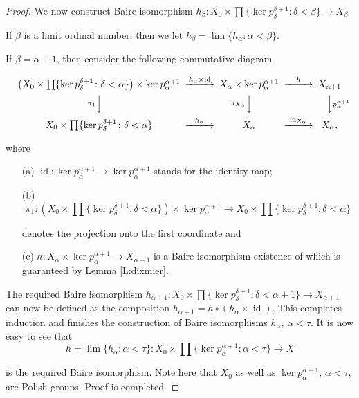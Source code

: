 \documentclass[12pt,draft]{amsart}
\theoremstyle{plain}
\theoremstyle{definition}
\numberwithin{equation}{section}
\begin{document}
\begin{proof}
We now construct Baire isomorphism
$\displaystyle h_{\beta} \colon X_{0} \times \prod\{
\ker p_{\delta}^{\delta +1}\colon \delta < \beta\} \to X_{\beta}$

If $\beta$ is a limit ordinal number, then we let
$h_{\beta} = \lim\{ h_{\alpha} \colon \alpha < \beta\}$.

If $\beta = \alpha +1$, then consider the following commutative diagram

\[
\begin{CD}
\left( X_{0} \times \prod\{ \ker p_{\delta}^{\delta +1}\colon \delta <
\alpha\}\right) \times \ker p_{\alpha}^{\alpha +1} @>h_{\alpha}\times \operatorname{id}>> X_{\alpha} \times \ker p_{\alpha}^{\alpha +1} @>h>> X_{\alpha +1}\\
@V{\pi_{1}}VV   @V{\pi_{X_{\alpha}}}VV @VV
{p_{\alpha}^{\alpha +1}}V\\
X_{0}\times \prod\{ \ker p_{\delta}^{\delta +1}\colon
\delta < \alpha\} @>h_{\alpha}>> X_{\alpha}
@>\operatorname{id}_{X_{\alpha}}>> X_{\alpha},
\end{CD}
\]
\bigskip

\noindent where 

\begin{itemize}
\item[(a)]
$\operatorname{id} \colon \ker p_{\alpha}^{\alpha +1} \to
\ker p_{\alpha}^{\alpha +1}$ stands for the identity map;
\item[(b)]
\[ \pi_{1} \colon \left( X_{0} \times \prod\{ \ker
p_{\delta}^{\delta +1}\colon \delta <
\alpha\}\right) \times \ker p_{\alpha}^{\alpha +1}
\to X_{0} \times \prod\{ \ker p_{\delta}^{\delta +1}\colon \delta <
\alpha\}\]

\noindent denotes the projection onto the first coordinate and
\item[(c)]
$h \colon X_{\alpha} \times \ker p_{\alpha}^{\alpha +1} \to
X_{\alpha +1}$ is a Baire isomorphism
existence of which is guaranteed by Lemma \ref{L:dixmier}.
\end{itemize}
The required Baire isomorphism $\displaystyle h_{\alpha +1}
\colon X_{0} \times \prod\{ \ker p_{\delta}^{\delta +1} \colon
\delta < \alpha +1\} \to X_{\alpha +1}$ can now be defined as
the composition $h_{\alpha +1} = h\circ \left( h_{\alpha} \times
\operatorname{id}\right)$.
This completes induction and finishes the construction of Baire
isomorphisms
$h_{\alpha}$, $\alpha < \tau$. It is now easy to see that 
\[ h = \lim\{ h_{\alpha} \colon \alpha < \tau\} \colon
X_{0} \times \prod\{ \ker p_{\alpha}^{\alpha +1} \colon \alpha < \tau \} \to X\]

\noindent is the required Baire isomorphism. Note here that $X_{0}$ as well as
$\ker p_{\alpha}^{\alpha +1}$, $\alpha < \tau$, are Polish groups.
Proof is completed.
\end{proof}
\end{document}

